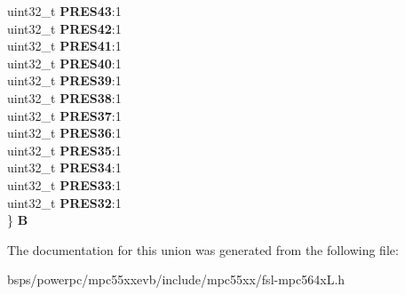 \begin{DoxyCompactItemize}
\begin{tabbing}
\>uint32\_t {\bfseries PRES43}:1\\
\>uint32\_t {\bfseries PRES42}:1\\
\>uint32\_t {\bfseries PRES41}:1\\
\>uint32\_t {\bfseries PRES40}:1\\
\>uint32\_t {\bfseries PRES39}:1\\
\>uint32\_t {\bfseries PRES38}:1\\
\>uint32\_t {\bfseries PRES37}:1\\
\>uint32\_t {\bfseries PRES36}:1\\
\>uint32\_t {\bfseries PRES35}:1\\
\>uint32\_t {\bfseries PRES34}:1\\
\>uint32\_t {\bfseries PRES33}:1\\
\>uint32\_t {\bfseries PRES32}:1\\
\} {\bfseries B}\\

\end{tabbing}\end{DoxyCompactItemize}


The documentation for this union was generated from the following file\+:\begin{DoxyCompactItemize}
\item 
bsps/powerpc/mpc55xxevb/include/mpc55xx/fsl-\/mpc564x\+L.\+h\end{DoxyCompactItemize}
